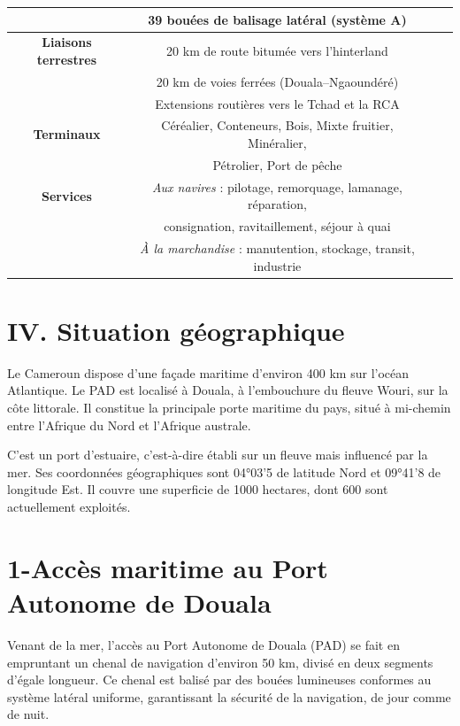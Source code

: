 \documentclass[a4paper,12pt,openany]{report}
\begin{document}
\begin{table}[htbp]
\begin{tabular}{|c|c|c|p{7cm}|}
			& 39 bouées de balisage latéral (système A) \\
			\hline
			\textbf{Liaisons terrestres} & 20 km de route bitumée vers l’hinterland \\
			& 20 km de voies ferrées (Douala–Ngaoundéré) \\
			& Extensions routières vers le Tchad et la RCA \\
			\hline
			\textbf{Terminaux} & Céréalier, Conteneurs, Bois, Mixte fruitier, Minéralier, \\
			& Pétrolier, Port de pêche \\
			\hline
			\textbf{Services} & \textit{Aux navires} : pilotage, remorquage, lamanage, réparation, \\
			& consignation, ravitaillement, séjour à quai \\
			& \textit{À la marchandise} : manutention, stockage, transit, industrie \\
			\hline
		\end{tabular}
		\label{tab:douala_accidents}
	\end{table}
	
	
	\section*{IV. Situation géographique}
	
	Le Cameroun dispose d’une façade maritime d’environ 400 km sur l’océan Atlantique. Le PAD est localisé à Douala, à l’embouchure du fleuve Wouri, sur la côte littorale. Il constitue la principale porte maritime du pays, situé à mi-chemin entre l’Afrique du Nord et l’Afrique australe.
	
	C’est un port d’estuaire, c’est-à-dire établi sur un fleuve mais influencé par la mer. Ses coordonnées géographiques sont 04°03’5 de latitude Nord et 09°41’8 de longitude Est. Il couvre une superficie de 1000 hectares, dont 600 sont actuellement exploités.
	
	
	\section*{1-Accès maritime au Port Autonome de Douala}
	
	Venant de la mer, l’accès au Port Autonome de Douala (PAD) se fait en empruntant un chenal de navigation d’environ 50 km, divisé en deux segments d’égale longueur. Ce chenal est balisé par des bouées lumineuses conformes au système latéral uniforme, garantissant la sécurité de la navigation, de jour comme de nuit.
	
\end{document}
